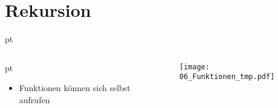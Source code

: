 
\section{Rekursion}
\begin{frame}[t]
    \slidehead

     pt
    \begin{columns}
        \begin{column}{4.5cm}
             pt
            \begin{itemize}
                \item Funktionen können sich selbst aufrufen
            \end{itemize}
        \end{column}

        \begin{column}{7cm}
            \begin{figure}
                \texttt{[image: 06\_Funktionen\_tmp.pdf]}
            \end{figure}
        \end{column}
    \end{columns}
\end{frame}

